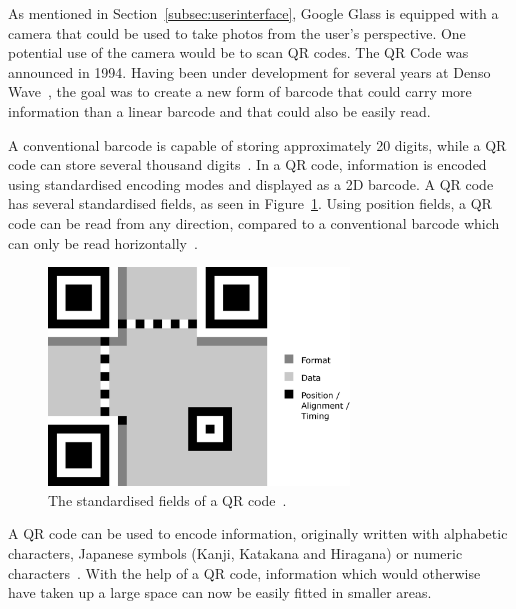As mentioned in Section~\ref{subsec:userinterface}, Google Glass is equipped with a camera that could be used to take photos from the user's perspective. One potential use of the camera would be to scan QR codes. The QR Code was announced in 1994. Having been under development for several years at Denso Wave~\cite{qrCodeHistory}, the goal was to create a new form of barcode that could carry more information than a linear barcode and that could also be easily read.

A conventional barcode is capable of storing approximately 20 digits, while a QR code can store several thousand digits~\cite{qrCodeType}. In a QR code, information is encoded using standardised encoding modes and displayed as a 2D barcode. A QR code has several standardised fields, as seen in Figure~\ref{qrcodeMall}. Using position fields, a QR code can be read from any direction, compared to a conventional barcode which can only be read horizontally~\cite{qrCodeAbout}.

	
	\begin{figure}[H]%
		\centering
		\includegraphics[width=80mm]{images/qrcodeMall}
		\caption{The standardised fields of a QR code~\cite{qrCodeWiki}.}
		\label{qrcodeMall}
	\end{figure}
	 
A QR code can be used to encode information, originally written with alphabetic characters, Japanese symbols (Kanji, Katakana and Hiragana) or numeric characters~\cite{qrCodeVersion}. With the help of a QR code, information which would otherwise have taken up a large space can now be easily fitted in smaller areas.

